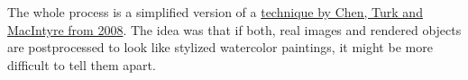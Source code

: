 The whole process is a simplified version of a
\href{http://csnotes.upm.edu.my/kelasmaya/web.nsf/0/d82e709c4661ce464825766400365c4d/$FILE/p231-chen.pdf}{technique
by Chen, Turk and MacIntyre from 2008}\cite{watercolor}. The idea was that if both, real
images and rendered objects are postprocessed to look like stylized
watercolor paintings, it might be more difficult to tell them apart.